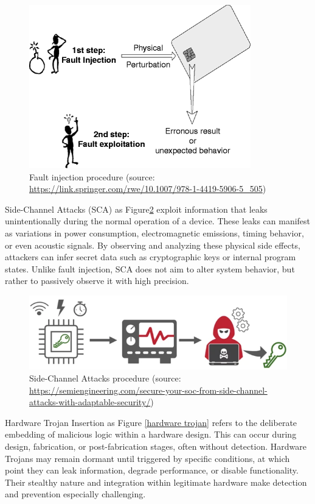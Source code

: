\begin{figure}[t!]
  \centering
  \includegraphics[width=0.5\linewidth]{Chapitre1/figures/fault.png}
  \caption{Fault injection procedure (source: \url{https://link.springer.com/rwe/10.1007/978-1-4419-5906-5_505})}
  \label{fault injection}
\end{figure}

Side-Channel Attacks (SCA) \cite{kelsey1998side} as Figure\ref{side channel attack} exploit information that leaks unintentionally during the normal operation of a device. These leaks can manifest as variations in power consumption, electromagnetic emissions, timing behavior, or even acoustic signals. By observing and analyzing these physical side effects, attackers can infer secret data such as cryptographic keys or internal program states. Unlike fault injection, SCA does not aim to alter system behavior, but rather to passively observe it with high precision.

\begin{figure}[t!]
  \centering
  \includegraphics[width=0.5\linewidth]{Chapitre1/figures/sca.png}
  \caption{Side-Channel Attacks procedure (source: \url{https://semiengineering.com/secure-your-soc-from-side-channel-attacks-with-adaptable-security/})}
  \label{side channel attack}
\end{figure}

Hardware Trojan Insertion \cite{chakraborty2009hardware} as Figure \ref{hardware trojan} refers to the deliberate embedding of malicious logic within a hardware design. This can occur during design, fabrication, or post-fabrication stages, often without detection. Hardware Trojans may remain dormant until triggered by specific conditions, at which point they can leak information, degrade performance, or disable functionality. Their stealthy nature and integration within legitimate hardware make detection and prevention especially challenging.

